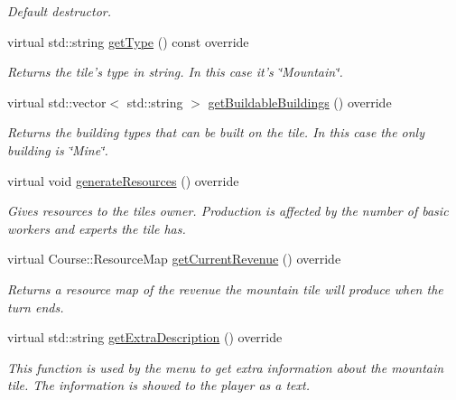 \begin{DoxyCompactItemize}
\begin{DoxyCompactList}\small\item\em Default destructor. \end{DoxyCompactList}\item 
virtual std\-::string \hyperlink{class_student_1_1_mountain_a0557d9683574b5d69a69b0477ce10595}{get\-Type} () const override
\begin{DoxyCompactList}\small\item\em Returns the tile's type in string. In this case it's \char`\"{}\-Mountain\char`\"{}. \end{DoxyCompactList}\item 
virtual std\-::vector$<$ std\-::string $>$ \hyperlink{class_student_1_1_mountain_a7c64354f71988918c2d01d2f976fb241}{get\-Buildable\-Buildings} () override
\begin{DoxyCompactList}\small\item\em Returns the building types that can be built on the tile. In this case the only building is \char`\"{}\-Mine\char`\"{}. \end{DoxyCompactList}\item 
virtual void \hyperlink{class_student_1_1_mountain_a13627929d43e19e56300ef40cb0af85b}{generate\-Resources} () override
\begin{DoxyCompactList}\small\item\em Gives resources to the tiles owner. Production is affected by the number of basic workers and experts the tile has. \end{DoxyCompactList}\item 
virtual Course\-::\-Resource\-Map \hyperlink{class_student_1_1_mountain_a9254aa0bf18635ba1431dc5dc2d54bc6}{get\-Current\-Revenue} () override
\begin{DoxyCompactList}\small\item\em Returns a resource map of the revenue the mountain tile will produce when the turn ends. \end{DoxyCompactList}\item 
virtual std\-::string \hyperlink{class_student_1_1_mountain_a0b812c12eeaaf131c26b7398d8bcbb2b}{get\-Extra\-Description} () override
\begin{DoxyCompactList}\small\item\em This function is used by the menu to get extra information about the mountain tile. The information is showed to the player as a text. \end{DoxyCompactList}\end{DoxyCompactItemize}
